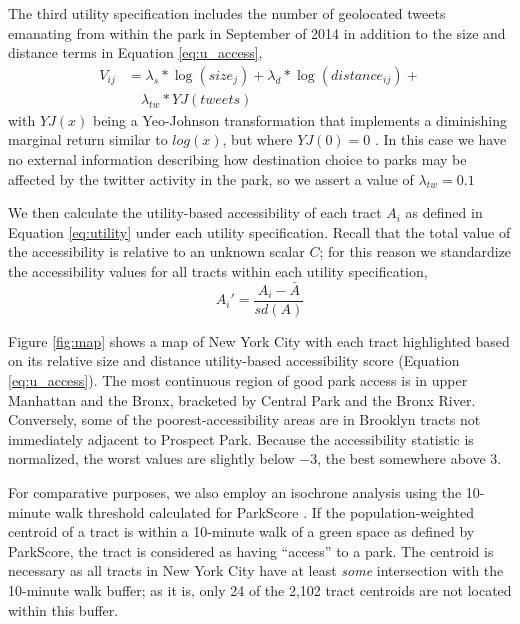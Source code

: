 \documentclass[Afour,sageh.bst]{sagej}
\begin{document}
The third utility specification includes the number of geolocated tweets
emanating from within the park in September of 2014 in addition to the
size and distance terms in Equation \ref{eq:u_access},
\begin{equation}\label{eq:u_tweets}
\begin{split}
V_{ij} &= \lambda_s * \log(size_j) + \lambda_d * \log(distance_{ij}) + \\ 
  &\quad \lambda_{tw} * YJ(tweets)
\end{split}
\end{equation} with \(YJ(x)\) being a Yeo-Johnson transformation that
implements a diminishing marginal return similar to \(log(x)\), but
where \(YJ(0) = 0\) \citep{Yeo2000}. In this case we have no external
information describing how destination choice to parks may be affected
by the twitter activity in the park, so we assert a value of
\(\lambda_{tw} = 0.1\)

We then calculate the utility-based accessibility of each tract \(A_i\)
as defined in Equation \ref{eq:utility} under each utility
specification. Recall that the total value of the accessibility is
relative to an unknown scalar \(C\); for this reason we standardize the
accessibility values for all tracts within each utility specification,
\begin{equation}\label{eq:v_logged}
A_i' = \frac{A_i - \bar{A}}{sd(A)}
\end{equation}

Figure \ref{fig:map} shows a map of New York City with each tract
highlighted based on its relative size and distance utility-based
accessibility score (Equation \ref{eq:u_access}). The most continuous
region of good park access is in upper Manhattan and the Bronx,
bracketed by Central Park and the Bronx River. Conversely, some of the
poorest-accessibility areas are in Brooklyn tracts not immediately
adjacent to Prospect Park. Because the accessibility statistic is
normalized, the worst values are slightly below \(-3\), the best
somewhere above \(3\).

For comparative purposes, we also employ an isochrone analysis using the
10-minute walk threshold calculated for ParkScore \citep{parkscore2019}.
If the population-weighted centroid of a tract is within a 10-minute
walk of a green space as defined by ParkScore, the tract is considered
as having ``access'' to a park. The centroid is necessary as all tracts
in New York City have at least \emph{some} intersection with the
10-minute walk buffer; as it is, only 24 of the 2,102 tract centroids
are not located within this buffer.
\end{document}
